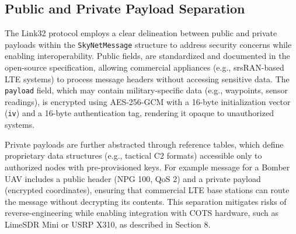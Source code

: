\documentclass{article}
\begin{document}
\subsection{Public and Private Payload Separation}
The Link32 protocol employs a clear delineation between public and private payloads
within the \texttt{SkyNetMessage} structure to address security concerns while
enabling interoperability. Public fields, are standardized and documented in the open-source specification,
allowing commercial appliances (e.g., srsRAN-based LTE systems) to process message headers
without accessing sensitive data. The \texttt{payload} field, which may contain
military-specific data (e.g., waypoints, sensor readings), is encrypted
using AES-256-GCM with a 16-byte initialization vector (\texttt{iv}) and a 16-byte
authentication tag, rendering it opaque to unauthorized systems.

Private payloads are further abstracted through reference tables,
which define proprietary data structures (e.g., tactical C2 formats) accessible
only to authorized nodes with pre-provisioned keys. For example
message for a Bomber UAV includes a public header (NPG 100, QoS 2) and a private
payload (encrypted coordinates), ensuring that commercial LTE base stations can
route the message without decrypting its contents. This separation mitigates
risks of reverse-engineering while enabling integration with COTS hardware,
such as LimeSDR Mini or USRP X310, as described in Section 8.
\end{document}
